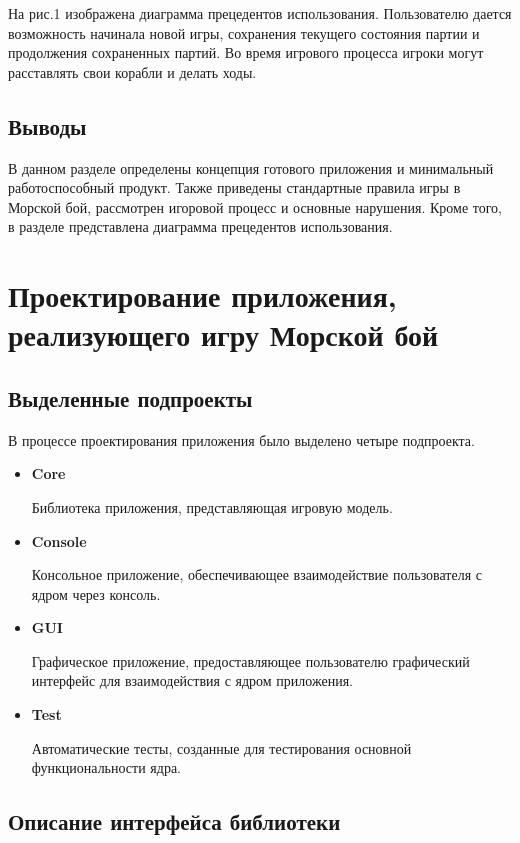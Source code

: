 \documentclass[a4paper]{article}
\begin{document}
На рис.1 изображена диаграмма прецедентов использования. Пользователю дается возможность начинала новой игры, сохранения текущего состояния партии и продолжения сохраненных партий. Во время игрового процесса игроки могут расставлять свои корабли и делать ходы.

\subsection{Выводы}

В данном разделе определены концепция готового приложения и минимальный работоспособный продукт. Также приведены стандартные правила игры в Морской бой, рассмотрен игоровой процесс и основные нарушения. Кроме того, в разделе представлена диаграмма прецедентов использования. 


\section{Проектирование приложения, реализующего игру Морской бой}

\subsection{Выделенные подпроекты}

В процессе проектирования приложения было выделено четыре подпроекта.

\begin{itemize}

\item \textbf{Core}

Библиотека приложения, представляющая игровую модель.

\item \textbf{Console}

Консольное приложение, обеспечивающее взаимодействие пользователя с ядром через консоль.

\item \textbf{GUI}

Графическое приложение, предоставляющее пользователю графический интерфейс для взаимодействия с ядром приложения.

\item \textbf{Test}

Автоматические тесты, созданные для тестирования основной функциональности ядра.

\end{itemize}

\subsection{Описание интерфейса библиотеки}
\end{document}
